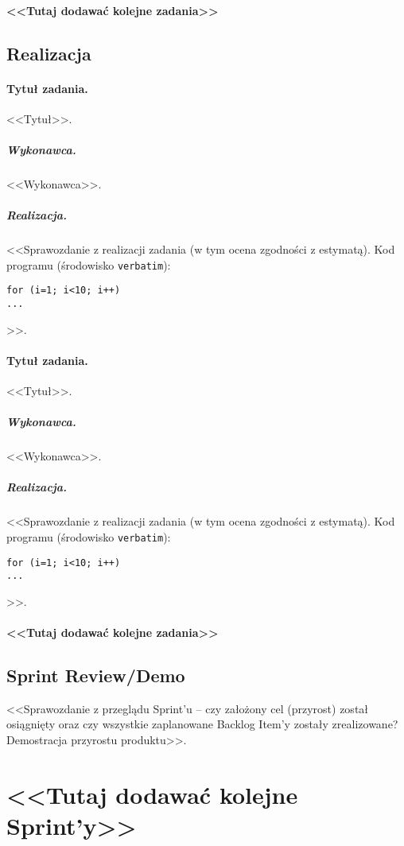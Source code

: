 \documentclass[a4paper]{article}
\begin{document}
\paragraph{<<Tutaj dodawać kolejne zadania>>}

\subsection{Realizacja}

\paragraph{Tytuł zadania.} <<Tytuł>>.
\subparagraph{Wykonawca.} <<Wykonawca>>.
\subparagraph{Realizacja.} <<Sprawozdanie z realizacji zadania (w tym ocena zgodności z estymatą). Kod programu (środowisko \texttt{verbatim}): \begin{verbatim}
for (i=1; i<10; i++)
...
\end{verbatim}>>.

\paragraph{Tytuł zadania.} <<Tytuł>>.
\subparagraph{Wykonawca.} <<Wykonawca>>.
\subparagraph{Realizacja.} <<Sprawozdanie z realizacji zadania (w tym ocena zgodności z estymatą). Kod programu (środowisko \texttt{verbatim}): \begin{verbatim}
for (i=1; i<10; i++)
...
\end{verbatim}>>.

\paragraph{<<Tutaj dodawać kolejne zadania>>}


\subsection{Sprint Review/Demo}
<<Sprawozdanie z przeglądu Sprint'u -- czy założony cel (przyrost) został osiągnięty oraz czy wszystkie zaplanowane Backlog Item'y zostały zrealizowane? Demostracja przyrostu produktu>>.

\section*{<<Tutaj dodawać kolejne Sprint'y>>}
\end{document}
